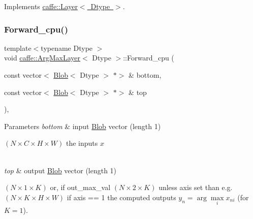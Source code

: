 Implements \mbox{\hyperlink{classcaffe_1_1_layer_a576ac6a60b1e99fe383831f52a6cea77}{caffe\+::\+Layer$<$ Dtype $>$}}.

\mbox{\label{classcaffe_1_1_arg_max_layer_a0e4cb76ff1796b71079f83335f033c44}} 
\subsubsection{\texorpdfstring{Forward\+\_\+cpu()}{Forward\_cpu()}\hspace{0.1cm}{\footnotesize\ttfamily [2/2]}}
{\footnotesize\ttfamily template$<$typename Dtype $>$ \\
void \mbox{\hyperlink{classcaffe_1_1_arg_max_layer}{caffe\+::\+Arg\+Max\+Layer}}$<$ Dtype $>$\+::Forward\+\_\+cpu (\begin{DoxyParamCaption}\item[{const vector$<$ \mbox{\hyperlink{classcaffe_1_1_blob}{Blob}}$<$ Dtype $>$ $\ast$$>$ \&}]{bottom,  }\item[{const vector$<$ \mbox{\hyperlink{classcaffe_1_1_blob}{Blob}}$<$ Dtype $>$ $\ast$$>$ \&}]{top }\end{DoxyParamCaption})\hspace{0.3cm}{\ttfamily [protected]}, {\ttfamily [virtual]}}


\begin{DoxyParams}{Parameters}
{\em bottom} & input \mbox{\hyperlink{classcaffe_1_1_blob}{Blob}} vector (length 1)
\begin{DoxyEnumerate}
\item $ (N \times C \times H \times W) $ the inputs $ x $ 
\end{DoxyEnumerate}\\
\hline
{\em top} & output \mbox{\hyperlink{classcaffe_1_1_blob}{Blob}} vector (length 1)
\begin{DoxyEnumerate}
\item $ (N \times 1 \times K) $ or, if out\+\_\+max\+\_\+val $ (N \times 2 \times K) $ unless axis set than e.\+g. $ (N \times K \times H \times W) $ if axis == 1 the computed outputs $ y_n = \arg\max\limits_i x_{ni} $ (for $ K = 1 $). 
\end{DoxyEnumerate}\\
\hline
\end{DoxyParams}



